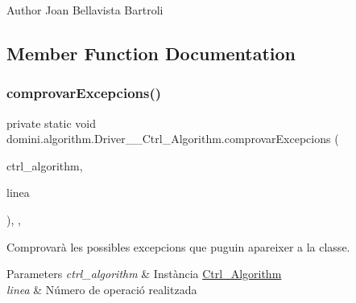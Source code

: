 \begin{DoxyAuthor}{Author}
Joan Bellavista Bartroli 
\end{DoxyAuthor}


\subsection{Member Function Documentation}
\mbox{\label{classdomini_1_1algorithm_1_1Driver____Ctrl__Algorithm_a38ad7761ecde80325d83ce2d2597a61b}} 
\subsubsection{\texorpdfstring{comprovar\+Excepcions()}{comprovarExcepcions()}}
{\footnotesize\ttfamily private static void domini.\+algorithm.\+Driver\+\_\+\+\_\+\+Ctrl\+\_\+\+Algorithm.\+comprovar\+Excepcions (\begin{DoxyParamCaption}\item[{\hyperlink{classdomini_1_1algorithm_1_1Ctrl__Algorithm}{Ctrl\+\_\+\+Algorithm}}]{ctrl\+\_\+algorithm,  }\item[{String}]{linea }\end{DoxyParamCaption})\hspace{0.3cm}{\ttfamily [inline]}, {\ttfamily [static]}, {\ttfamily [private]}}



Comprovarà les possibles excepcions que puguin apareixer a la classe. 


\begin{DoxyParams}{Parameters}
{\em ctrl\+\_\+algorithm} & Instància \hyperlink{classdomini_1_1algorithm_1_1Ctrl__Algorithm}{Ctrl\+\_\+\+Algorithm} \\
\hline
{\em linea} & Número de operació realitzada \\
\hline
\end{DoxyParams}
\mbox{\label{classdomini_1_1algorithm_1_1Driver____Ctrl__Algorithm_a2aa6a8b8f8c0c991a11b30e2bd1f244e}} 
